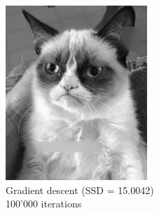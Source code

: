 \documentclass{paper}
\begin{document}
\begin{figure}[ht]
\centering
\begin{subfigure}[ht]{0.45\textwidth}
	\centering
	\includegraphics[width=\textwidth]{gradient_descent_cat-iter100000-lambda1000-alpha0_0005}
	\caption*{Gradient descent (SSD = 15.0042) \\100'000 iterations}
\end{subfigure}
~
\begin{subfigure}[ht]{0.45\textwidth}
	\centering

\end{subfigure}
\end{figure}
\end{document}
